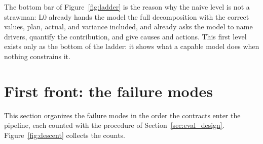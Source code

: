 \documentclass[12pt,a4paper,openright,twoside]{book}
\begin{document}
The bottom bar of Figure~\ref{fig:ladder} is the reason why the naive level is not a strawman: L0 already hands the model the full decomposition with the correct values, plan, actual, and variance included, and already asks the model to name drivers, quantify the contribution, and give causes and actions.
This first level exists only as the bottom of the ladder: it shows what a capable model does when nothing constrains it.


\section{First front: the failure modes}
\label{sec:front_modes}

This section organizes the failure modes in the order the contracts enter the pipeline, each counted with the procedure of Section~\ref{sec:eval_design}.
Figure~\ref{fig:descent} collects the counts.
\end{document}
